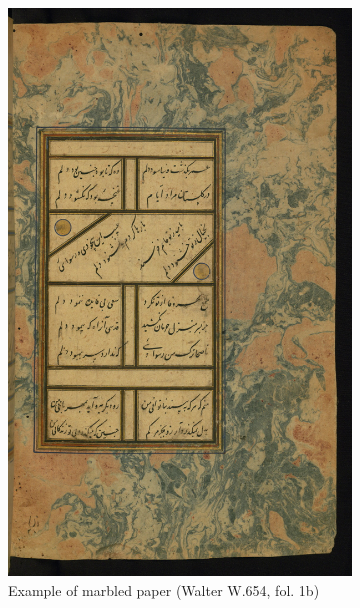 \begin{figure}[h!tp]
        \centering
	\begin{subfigure}[t]{0.3\textwidth}
		\centering
		\includegraphics[height=0.3\textheight]{images/W654_000010_sap.jpg}
		\caption{Example of marbled paper (Walter W.654, fol. 1b)}
                \label{fig:ara_marble}
        \end{subfigure}
	\hfill
	\begin{subfigure}[t]{.33\textwidth}
		\centering

\end{subfigure}
\end{figure}
